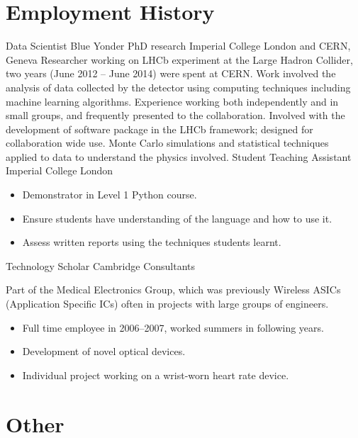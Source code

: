 \section{Employment History}
{Data Scientist}
{Blue Yonder}
{}{}
{
}
{PhD research}
{Imperial College London and CERN, Geneva}
{}{}
{
  Researcher working on LHCb experiment at the Large Hadron Collider, two years (June 2012 -- June
  2014) were spent at CERN.
  Work involved the analysis of data collected by the detector using computing techniques including
  machine learning algorithms.
  Experience working both independently and in small groups, and frequently presented to the
  collaboration.
  Involved with the development of software package in the LHCb framework; designed for
  collaboration wide use.
  Monte Carlo simulations and statistical techniques applied to data to understand the physics
  involved.
}
{Student Teaching Assistant}
{Imperial College London}
{}{}
{
  \begin{itemize}
    \item Demonstrator in Level 1 Python course.
    \item Ensure students have understanding of the language and how to use it.
    \item Assess written reports using the techniques students learnt.
  \end{itemize}
}
{Technology Scholar}
{Cambridge Consultants}
{}{}
{
  Part of the Medical Electronics Group, which was previously Wireless ASICs (Application
  Specific ICs) often in projects with large groups of engineers.
  \begin{itemize}
    \item Full time employee in 2006--2007, worked summers in following years.
    \item Development of novel optical devices.
    \item Individual project working on a wrist-worn heart rate device.
  \end{itemize}
}


\section{Other}

